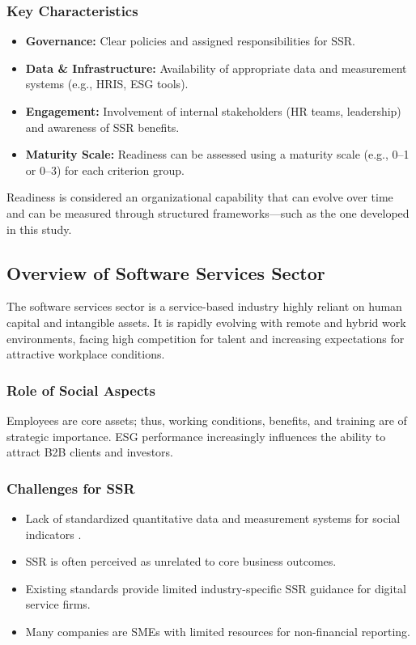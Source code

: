 \subsubsection{Key Characteristics}
\begin{itemize}
    \item \textbf{Governance:} Clear policies and assigned responsibilities for SSR.
    \item \textbf{Data \& Infrastructure:} Availability of appropriate data and measurement systems (e.g., HRIS, ESG tools).
    \item \textbf{Engagement:} Involvement of internal stakeholders (HR teams, leadership) and awareness of SSR benefits.
    \item \textbf{Maturity Scale:} Readiness can be assessed using a maturity scale (e.g., 0–1 or 0–3) for each criterion group.
\end{itemize}

Readiness is considered an organizational capability that can evolve over time and can be measured through structured frameworks—such as the one developed in this study.

\subsection{Overview of Software Services Sector}
The software services sector is a service-based industry highly reliant on human capital and intangible assets. It is rapidly evolving with remote and hybrid work environments, facing high competition for talent and increasing expectations for attractive workplace conditions.

\subsubsection{Role of Social Aspects}
Employees are core assets; thus, working conditions, benefits, and training are of strategic importance. ESG performance increasingly influences the ability to attract B2B clients and investors.

\subsubsection{Challenges for SSR}
\begin{itemize}
    \item Lack of standardized quantitative data and measurement systems for social indicators \parencite{Gibbons2024}.
    \item SSR is often perceived as unrelated to core business outcomes.
    \item Existing standards provide limited industry-specific SSR guidance for digital service firms.
    \item Many companies are SMEs with limited resources for non-financial reporting.
\end{itemize}

